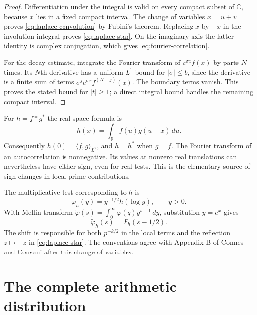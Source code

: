 \documentclass[11pt,letterpaper]{article}
\theoremstyle{definition}
\theoremstyle{remark}
\newcommand{\R}{\mathbb R}
\newcommand{\C}{\mathbb C}
\begin{document}
\begin{proof}
Differentiation under the integral is valid on every compact subset of
$\C$, because $x$ lies in a fixed compact interval. The change of
variables $x=u+v$ proves \eqref{eq:laplace-convolution} by Fubini's
theorem. Replacing $x$ by $-x$ in the involution integral proves
\eqref{eq:laplace-star}. On the imaginary axis the latter identity is
complex conjugation, which gives \eqref{eq:fourier-correlation}.

For the decay estimate, integrate the Fourier transform of
$e^{\sigma x}f(x)$ by parts $N$ times. Its $N$th derivative has a
uniform $L^1$ bound for $|\sigma|\le b$, since the derivative is a finite
sum of terms $\sigma^j e^{\sigma x}f^{(N-j)}(x)$. The boundary terms
vanish. This proves the stated bound for $|t|\ge1$; a direct integral
bound handles the remaining compact interval.
\end{proof}

For $h=f*g^*$ the real-space formula is
\begin{equation}\label{eq:correlation}
 h(x)=\int_\R f(u)\overline{g(u-x)}\,du.
\end{equation}
Consequently $h(0)=\langle f,g\rangle_{L^2}$, and $h=h^*$ when $g=f$.
The Fourier transform of an autocorrelation is nonnegative. Its values
at nonzero real translations can nevertheless have either sign, even
for real tests. This is the elementary source of sign changes in local
prime contributions.

The multiplicative test corresponding to $h$ is
\begin{equation}\label{eq:multiplicative-test}
 \varphi_h(y)=y^{-1/2}h(\log y),\qquad y>0.
\end{equation}
With Mellin transform $\widetilde\varphi(s)=\int_0^\infty
\varphi(y)y^{s-1}\,dy$, substitution $y=e^x$ gives
\begin{equation}\label{eq:mellin-shift}
 \widetilde\varphi_h(s)=F_h(s-1/2).
\end{equation}
The shift is responsible for both $p^{-k/2}$ in the local terms and the
reflection $z\mapsto-\overline z$ in \eqref{eq:laplace-star}.
The conventions agree with Appendix B of Connes and Consani
\cite{CC2020} after this change of variables.

\section{The complete arithmetic distribution}
\end{document}
